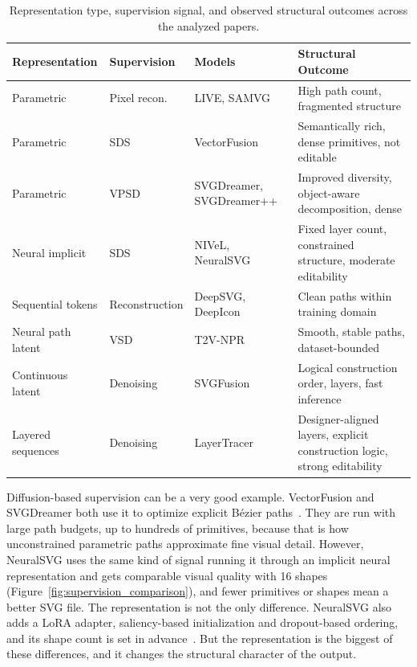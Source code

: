 \begin{table}[htbp]
\centering
\caption{Representation type, supervision signal, 
and observed structural outcomes across the 
analyzed papers.}
\label{tab:representation_outcomes}
\footnotesize
\begin{tabularx}{\textwidth}{l l >{\raggedright\arraybackslash}p{2.7cm} >{\raggedright\arraybackslash}X}
\toprule
\textbf{Representation} & \textbf{Supervision} & 
\textbf{Models} & \textbf{Structural Outcome} \\
\midrule
Parametric    & Pixel recon.   & LIVE, SAMVG       
              & High path count, 
                fragmented structure \\
Parametric    & SDS            & VectorFusion      
              & Semantically rich, dense primitives, 
                not editable \\
Parametric    & VPSD           & SVGDreamer, SVGDreamer++ 
              & Improved diversity, object-aware 
                decomposition, dense \\
Neural implicit & SDS          & NIVeL, NeuralSVG  
              & Fixed layer count, constrained 
                structure, moderate editability \\
Sequential tokens & Reconstruction & DeepSVG, DeepIcon 
              & Clean paths within training domain \\
Neural path latent & VSD       & T2V-NPR           
              & Smooth, stable paths, 
                dataset-bounded \\
Continuous latent & Denoising  & SVGFusion         
              & Logical construction order, 
                layers, fast inference \\
Layered sequences & Denoising  & LayerTracer       
              & Designer-aligned layers, explicit 
                construction logic, strong editability \\
\bottomrule
\end{tabularx}
\end{table}

Diffusion-based supervision can be a very good example. VectorFusion 
and SVGDreamer both use it to optimize explicit B\'{e}zier 
paths~\cite{jainVectorFusionTexttoSVGAbstracting2022, 
xingSVGDreamerTextGuided2024}. They are run with large path budgets, 
up to hundreds of primitives, because that is how unconstrained 
parametric paths approximate fine visual detail.
However, NeuralSVG uses the same kind of signal running it through 
an implicit neural representation and gets comparable 
visual quality with 16 
shapes (Figure~\ref{fig:supervision_comparison}),
and fewer primitives or shapes mean a better SVG file.
The representation is not the only difference. NeuralSVG also adds a LoRA adapter, 
saliency-based initialization and dropout-based ordering, and its shape count is set 
in advance~\cite{polaczekNeuralSVGImplicitRepresentation2025}. But the representation is the 
biggest of these differences, and it changes the structural character of the output.

